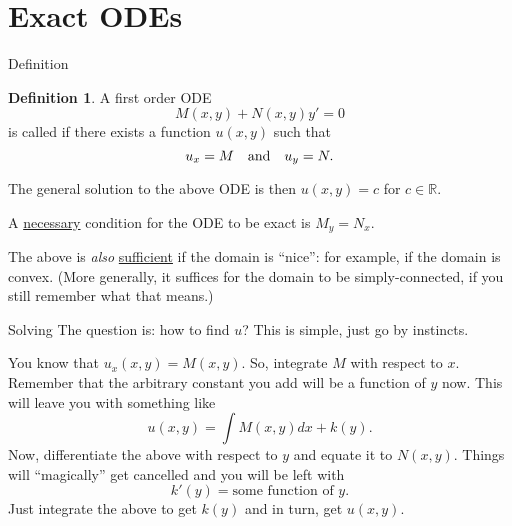 \documentclass[dvipsnames, handout]{beamer}
\theoremstyle{definition}
\newtheorem{defn}[thm]{Definition}
\begin{document}
\section{Exact ODEs}

\begin{frame}{Definition}
  \begin{defn}
    A first order ODE
    \begin{equation*} 
      M(x, y) + N(x, y) y' = 0
    \end{equation*}
    is called  \pause if there exists a function $u(x, y)$ such that
    \begin{equation*} 
      u_{x} = M \quad\text{and}\quad u_{y} = N.
    \end{equation*}
  \end{defn} \pause
  The general solution to the above ODE is then $u(x, y) = c$ for $c \in \mathbb{R}$. \pause

  A \underline{necessary} condition for the ODE to be exact is $M_{y} = N_{x}$. \pause

  The above is \emph{also} \underline{sufficient} if the domain is ``nice'': for example, if the domain is convex. \pause (More generally, it suffices for the domain to be simply-connected, if you still remember what that means.)
\end{frame}
\begin{frame}{Solving}
  The question is: how to find $u$? \pause This is simple, just go by instincts. \pause

  You know that $u_{x}(x, y) = M(x, y)$. \pause So, integrate $M$ with respect to $x$. \pause Remember that the arbitrary constant you add will be a function of $y$ now. \pause This will leave you with something like 
  \begin{equation*} 
    u(x, y) = \int M(x, y) dx + k(y).
  \end{equation*} \pause
  Now, differentiate the above with respect to $y$ and equate it to $N(x, y)$. \pause Things will ``magically'' get cancelled and you will be left with \pause
  \begin{equation*} 
    k'(y) = \text{some function of $y$}.
  \end{equation*} \pause
  Just integrate the above to get $k(y)$ and in turn, get $u(x, y)$. 
\end{frame}
\end{document}
